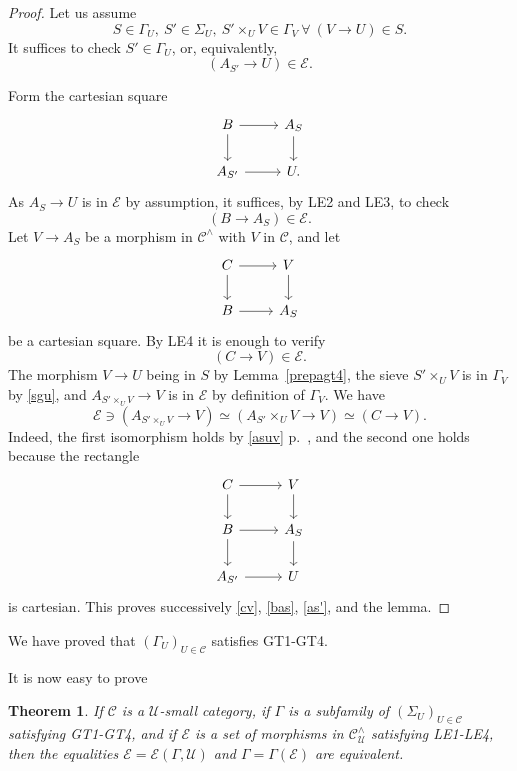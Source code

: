 \documentclass[12pt]{article}
\newtheorem{thm}{Theorem}
\theoremstyle{remark}
\theoremstyle{definition}
\newcommand{\cc}{\mathcal}
\newcommand{\C}{\mathcal C}
\newcommand{\U}{\mathcal U}
\begin{document}
\begin{proof} 
Let us assume 
%
\begin{equation}\label{sgu}
S\in\Gamma_U,\ S'\in\Sigma_U,\ S'\times_UV\in\Gamma_V\ \forall\ (V\to U)\in S.
\end{equation}
%
It suffices to check $S'\in\Gamma_U$, or, equivalently, 
%
\begin{equation}\label{as'}
(A_{S'}\to U)\in\cc E.
\end{equation}

Form the cartesian square 
$$
\begin{tikzcd}
B\ar{r}\ar{d}&A_S\ar{d}\\ 
A_{S'}\ar{r}&U.
\end{tikzcd}
$$ 
As $A_S\to U$ is in $\cc E$ by assumption, it suffices, by LE2 and LE3, to check  
%
\begin{equation}\label{bas}
(B\to A_S)\in\cc E.
\end{equation}
%
Let $V\to A_S$ be a morphism in $\C^\wedge$ with $V$ in $\C$, and let 
$$
\begin{tikzcd}
C\ar{r}\ar{d}&V\ar{d}\\ 
B\ar{r}&A_S
\end{tikzcd}
$$ 
be a cartesian square. By LE4 it is enough to verify 
%
\begin{equation}\label{cv}
(C\to V)\in\cc E.
\end{equation} 
% 
The morphism $V\to U$ being in $S$ by Lemma~\ref{prepagt4}, the sieve $S'\times_UV$ is in $\Gamma_V$ by \eqref{sgu}, and $A_{S'\times_UV}\to V$ is in $\cc E$ by definition of $\Gamma_V$. We have 
$$
\cc E\ni(A_{S'\times_UV}\to V)\simeq(A_{S'}\times_UV\to V)\simeq(C\to V).
$$ 
Indeed, the first isomorphism holds by \eqref{asuv} p.~\pageref{asuv}, and the second one holds because the rectangle 
$$
\begin{tikzcd}
C\ar{r}\ar{d}&V\ar{d}\\ 
B\ar{r}\ar{d}&A_S\ar{d}\\ 
A_{S'}\ar{r}&U
\end{tikzcd}
$$ 
is cartesian. This proves successively \eqref{cv}, \eqref{bas}, \eqref{as'}, and the lemma.  
\end{proof}

We have proved that $(\Gamma_U)_{U\in\C}$ satisfies GT1-GT4. 

It is now easy to prove 

\begin{thm}
If $\C$ is a $\U$-small category, if $\Gamma$ is a subfamily of $(\Sigma_U)_{U\in\C}$ satisfying GT1-GT4, and if $\cc E$ is a set of morphisms in $\C^\wedge_\U$ satisfying LE1-LE4, then the equalities $\cc E=\cc E(\Gamma,\U)$ and $\Gamma=\Gamma(\cc E)$ are equivalent.
\end{thm}
\end{document}

